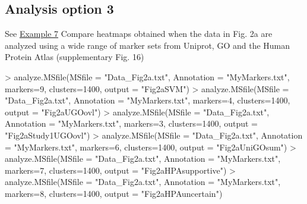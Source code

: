 \documentclass[a4paper]{article}
\numberwithin{equation}{subsection}
\begin{document}
\subsection{Analysis option 3}
\label{opt3}
See \hyperref[ex7]{Example 7}
Compare heatmaps obtained when the data in Fig. 2a are analyzed using a wide range of marker sets from Uniprot, GO and the Human Protein Atlas  (supplementary Fig. 16)
\scriptsize
\begin{Schunk}
\begin{Sinput}
> analyze.MSfile(MSfile = "Data_Fig2a.txt", Annotation = "MyMarkers.txt", markers=9, clusters=1400, output = "Fig2aSVM")
> analyze.MSfile(MSfile = "Data_Fig2a.txt", Annotation = "MyMarkers.txt", markers=4, clusters=1400, output = "Fig2aUGOovl")
> analyze.MSfile(MSfile = "Data_Fig2a.txt", Annotation = "MyMarkers.txt", markers=3, clusters=1400, output = "Fig2aStudy1UGOovl")
> analyze.MSfile(MSfile = "Data_Fig2a.txt", Annotation = "MyMarkers.txt", markers=6, clusters=1400, output = "Fig2aUniGOsum")
> analyze.MSfile(MSfile = "Data_Fig2a.txt", Annotation = "MyMarkers.txt", markers=7, clusters=1400, output = "Fig2aHPAsupportive")
> analyze.MSfile(MSfile = "Data_Fig2a.txt", Annotation = "MyMarkers.txt", markers=8, clusters=1400, output = "Fig2aHPAuncertain")
\end{Sinput}
\end{Schunk}
\normalsize
\end{document}
